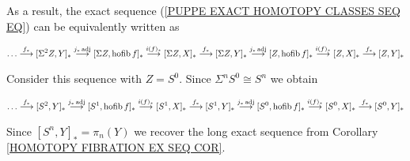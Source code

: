 As a result, the exact sequence (\ref{PUPPE EXACT HOMOTOPY CLASSES SEQ EQ}) can be 
equivalently written as 

\begin{multline*}
\dots 
\overset{f_{\ast}}{\longrightarrow} [\Sigma^{2} Z, Y]_{\ast}
\overset{j_{\ast}\operatorname{adj}}{\longrightarrow} [\Sigma Z,  \operatorname{hofib} f ]_{\ast}
\overset{i(f)_{\ast}}{\longrightarrow} [\Sigma Z,  X ]_{\ast} 
\overset{f_{\ast}}{\longrightarrow} [\Sigma Z, Y ]_{\ast} 
\overset{j_{\ast}\operatorname{adj}}{\longrightarrow} [Z, \operatorname{hofib} f ]_{\ast} 
\overset{i(f)_{\ast}}{\longrightarrow} [Z, X ]_{\ast} 
\overset{f_{\ast}}{\longrightarrow} [Z, Y ]_{\ast} 
\end{multline*}

Consider this sequence with $Z=S^{0}$. Since $\Sigma^{n} S^{0}\cong S^{n}$ we obtain

\begin{multline*}
\dots 
\overset{f_{\ast}}{\longrightarrow} [S^{2}, Y]_{\ast}
\overset{j_{\ast}\operatorname{adj}}{\longrightarrow} [S^{1},  \operatorname{hofib} f ]_{\ast}
\overset{i(f)_{\ast}}{\longrightarrow} [S^{1},  X ]_{\ast} 
\overset{f_{\ast}}{\longrightarrow} [S^{1}, Y ]_{\ast} 
\overset{j_{\ast}\operatorname{adj}}{\longrightarrow} [S^{0}, \operatorname{hofib} f ]_{\ast} 
\overset{i(f)_{\ast}}{\longrightarrow} [S^{0}, X ]_{\ast} 
\overset{f_{\ast}}{\longrightarrow} [S^{0}, Y ]_{\ast} 
\end{multline*}

Since $[S^{n}, Y]_{\ast} = \pi_{n}(Y)$ we recover the long 
exact sequence from Corollary \ref{HOMOTOPY FIBRATION EX SEQ COR}.  









